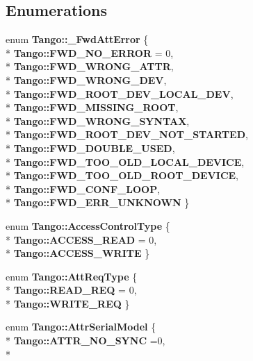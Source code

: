 \subsection*{Enumerations}
\begin{DoxyCompactItemize}
\item 
enum {\bf Tango\-::\-\_\-\-Fwd\-Att\-Error} \{ \\*
{\bf Tango\-::\-F\-W\-D\-\_\-\-N\-O\-\_\-\-E\-R\-R\-O\-R} = 0, 
\\*
{\bf Tango\-::\-F\-W\-D\-\_\-\-W\-R\-O\-N\-G\-\_\-\-A\-T\-T\-R}, 
\\*
{\bf Tango\-::\-F\-W\-D\-\_\-\-W\-R\-O\-N\-G\-\_\-\-D\-E\-V}, 
\\*
{\bf Tango\-::\-F\-W\-D\-\_\-\-R\-O\-O\-T\-\_\-\-D\-E\-V\-\_\-\-L\-O\-C\-A\-L\-\_\-\-D\-E\-V}, 
\\*
{\bf Tango\-::\-F\-W\-D\-\_\-\-M\-I\-S\-S\-I\-N\-G\-\_\-\-R\-O\-O\-T}, 
\\*
{\bf Tango\-::\-F\-W\-D\-\_\-\-W\-R\-O\-N\-G\-\_\-\-S\-Y\-N\-T\-A\-X}, 
\\*
{\bf Tango\-::\-F\-W\-D\-\_\-\-R\-O\-O\-T\-\_\-\-D\-E\-V\-\_\-\-N\-O\-T\-\_\-\-S\-T\-A\-R\-T\-E\-D}, 
\\*
{\bf Tango\-::\-F\-W\-D\-\_\-\-D\-O\-U\-B\-L\-E\-\_\-\-U\-S\-E\-D}, 
\\*
{\bf Tango\-::\-F\-W\-D\-\_\-\-T\-O\-O\-\_\-\-O\-L\-D\-\_\-\-L\-O\-C\-A\-L\-\_\-\-D\-E\-V\-I\-C\-E}, 
\\*
{\bf Tango\-::\-F\-W\-D\-\_\-\-T\-O\-O\-\_\-\-O\-L\-D\-\_\-\-R\-O\-O\-T\-\_\-\-D\-E\-V\-I\-C\-E}, 
\\*
{\bf Tango\-::\-F\-W\-D\-\_\-\-C\-O\-N\-F\-\_\-\-L\-O\-O\-P}, 
\\*
{\bf Tango\-::\-F\-W\-D\-\_\-\-E\-R\-R\-\_\-\-U\-N\-K\-N\-O\-W\-N}
 \}
\item 
enum {\bf Tango\-::\-Access\-Control\-Type} \{ \\*
{\bf Tango\-::\-A\-C\-C\-E\-S\-S\-\_\-\-R\-E\-A\-D} = 0, 
\\*
{\bf Tango\-::\-A\-C\-C\-E\-S\-S\-\_\-\-W\-R\-I\-T\-E}
 \}
\item 
enum {\bf Tango\-::\-Att\-Req\-Type} \{ \\*
{\bf Tango\-::\-R\-E\-A\-D\-\_\-\-R\-E\-Q} = 0, 
\\*
{\bf Tango\-::\-W\-R\-I\-T\-E\-\_\-\-R\-E\-Q}
 \}
\item 
enum {\bf Tango\-::\-Attr\-Serial\-Model} \{ \\*
{\bf Tango\-::\-A\-T\-T\-R\-\_\-\-N\-O\-\_\-\-S\-Y\-N\-C} =0, 
\\*

\end{DoxyCompactItemize}
